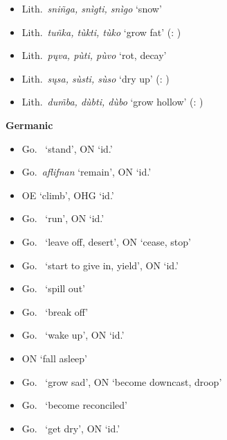 \documentclass[output=paper,colorlinks,citecolor=brown]{langscibook}
\begin{document}
\begin{exe}
\begin{xlist}
\begin{itemize}
        \item Lith.\ \textit{sniñga, snìgti, snìgo} ‘snow’
        \item Lith.\ \textit{tuñka, tùkti, tùko} ‘grow fat’ (: )
        \item Lith.\ \textit{pųva, pùti, pùvo} ‘rot, decay’
        \item Lith.\ \textit{sųsa, sùsti, sùso} ‘dry up’ (: )
        \item Lith.\ \textit{dum̃ba, dùbti, dùbo} ‘grow hollow’ (: )
    \end{itemize}
    \ex \textbf{Germanic}
    \begin{itemize}
        \item Go.\  ‘stand', ON  ‘id.’
        \item Go.\ \textit{aflifnan} ‘remain', ON  ‘id.’
        \item OE  ‘climb', OHG  ‘id.’
        \item Go.\  ‘run', ON  ‘id.’
        \item Go.\  ‘leave off, desert', ON  ‘cease, stop’
        \item Go.\  ‘start to give in, yield', ON  ‘id.’
        \item Go.\  ‘spill out’
        \item Go.\  ‘break off’
        \item Go.\  ‘wake up', ON  ‘id.’
        \item ON  ‘fall asleep’
        \item Go.\  ‘grow sad', ON  ‘become downcast, droop’
        \item Go.\  ‘become reconciled’
        \item Go.\  ‘get dry', ON  ‘id.’

\end{itemize}
\end{xlist}
\end{exe}
\end{document}
